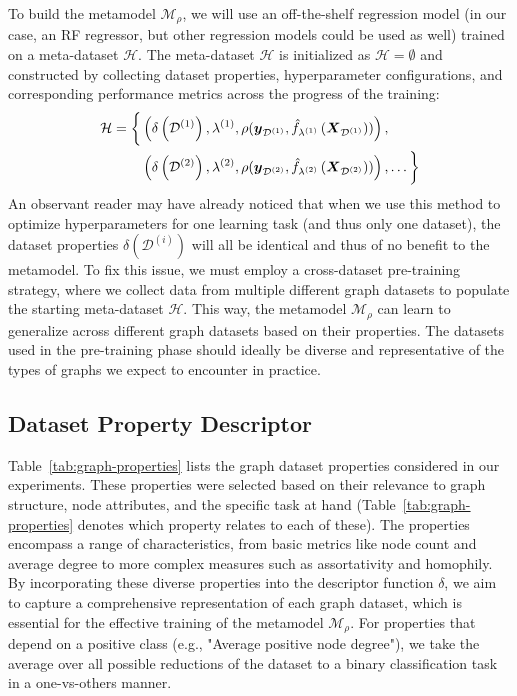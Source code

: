 To build the metamodel \( \mathcal{M}_\rho \), we will use an off-the-shelf regression model (in our case, an RF regressor, but other regression models could be used as well) trained on a meta-dataset \( \mathcal{H} \).
The meta-dataset \( \mathcal{H} \) is initialized as \( \mathcal{H} = \emptyset \) and constructed by collecting dataset properties, hyperparameter configurations, and corresponding performance metrics across the progress of the training:
\begin{equation*}
	\begin{split}
		\mathcal{H} = \biggl\{ &\left( \delta \left( \mathcal{D}^{(1)} \right), \lambda^{(1)}, \rho( \boldsymbol{y}_{\mathcal{D}^{(1)}}, \hat{f}_{\lambda^{(1)}} \left( \boldsymbol{X}_{\mathcal{D}^{(1)}} \right) ) \right), \\
		&\left( \delta \left( \mathcal{D}^{(2)} \right), \lambda^{(2)}, \rho( \boldsymbol{y}_{\mathcal{D}^{(2)}}, \hat{f}_{\lambda^{(2)}} \left( \boldsymbol{X}_{\mathcal{D}^{(2)}} \right) ) \right), \dots \biggr\}
	\end{split}
\end{equation*}
An observant reader may have already noticed that when we use this method to optimize hyperparameters for one learning task (and thus only one dataset), the dataset properties \( \delta \left( \mathcal{D}^{(i)} \right) \) will all be identical and thus of no benefit to the metamodel. To fix this issue, we must employ a cross-dataset pre-training strategy, where we collect data from multiple different graph datasets to populate the starting meta-dataset \( \mathcal{H} \). This way, the metamodel \( \mathcal{M}_\rho \) can learn to generalize across different graph datasets based on their properties. The datasets used in the pre-training phase should ideally be diverse and representative of the types of graphs we expect to encounter in practice.

\subsection{Dataset Property Descriptor}

Table~\ref{tab:graph-properties} lists the graph dataset properties considered in our experiments. These properties were selected based on their relevance to graph structure, node attributes, and the specific task at hand (Table~\ref{tab:graph-properties} denotes which property relates to each of these). The properties encompass a range of characteristics, from basic metrics like node count and average degree to more complex measures such as assortativity and homophily. By incorporating these diverse properties into the descriptor function \( \delta \), we aim to capture a comprehensive representation of each graph dataset, which is essential for the effective training of the metamodel \( \mathcal{M}_\rho \). For properties that depend on a positive class (e.g., "Average positive node degree"), we take the average over all possible reductions of the dataset to a binary classification task in a one-vs-others manner.

